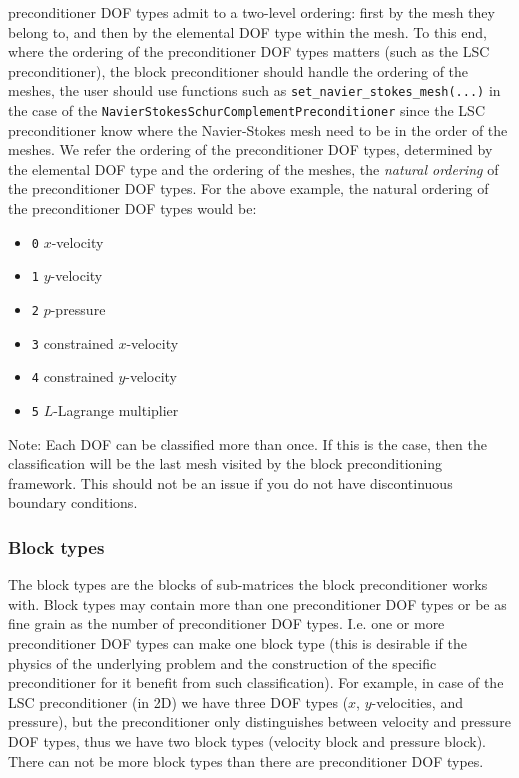  preconditioner DOF types admit to a two-level ordering: first by the mesh 
they belong to, and then by the elemental DOF type within the mesh. To this end, 
where the ordering of the preconditioner DOF types matters (such as the 
LSC preconditioner), the block preconditioner should handle the ordering of the 
meshes, the user should use functions such as 
\texttt{set\_\allowbreak navier\_\allowbreak stokes\_\allowbreak mesh(...)}
in the case of the 
\texttt{Navier\allowbreak Stokes\allowbreak Schur\allowbreak Complement\allowbreak Preconditioner} 
since the LSC preconditioner know where the Navier-Stokes mesh need to be in 
the order of the meshes. We refer the ordering of the preconditioner DOF types, 
determined by the elemental DOF type and the ordering of the meshes, the 
\emph{natural ordering} of the preconditioner DOF types. For the above example, 
the natural ordering of the preconditioner DOF
types would be:
\begin{itemize}
 \item \texttt{0} $x$-velocity
 \item \texttt{1} $y$-velocity
 \item \texttt{2} $p$-pressure
 \item \texttt{3} constrained $x$-velocity
 \item \texttt{4} constrained $y$-velocity
 \item \texttt{5} $L$-Lagrange multiplier
\end{itemize}
Note: Each DOF can be classified more than once. If this is the case, then the 
classification will be the last mesh visited by the block preconditioning 
framework. This should not be an issue if you do not have discontinuous 
boundary conditions.

\subsubsection{Block types}
The block types are the blocks of sub-matrices the block preconditioner works 
with. Block types may contain more than one preconditioner DOF types or be as 
fine grain as the number of preconditioner DOF types. I.e. one or more 
preconditioner DOF types can make one block type (this is desirable if the 
physics of the underlying problem and the construction of the specific
preconditioner for it benefit from such classification). For example, in case 
of the LSC preconditioner (in 2D) we have three DOF types ($x$, $y$-velocities, 
and pressure), but the preconditioner only distinguishes between velocity and 
pressure DOF types, thus we have two block types (velocity block and pressure 
block). There can not be more block types than there are preconditioner DOF
types. 


